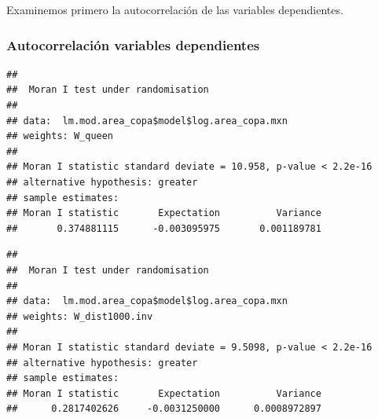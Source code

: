 \documentclass[12pt,]{book}
\newenvironment{Shaded}{\begin{snugshade}}{\end{snugshade}}
\newcommand{\KeywordTok}[1]{\textcolor[rgb]{0.13,0.29,0.53}{\textbf{#1}}}
\newcommand{\DataTypeTok}[1]{\textcolor[rgb]{0.13,0.29,0.53}{#1}}
\newcommand{\OtherTok}[1]{\textcolor[rgb]{0.56,0.35,0.01}{#1}}
\newcommand{\OperatorTok}[1]{\textcolor[rgb]{0.81,0.36,0.00}{\textbf{#1}}}
\newcommand{\NormalTok}[1]{#1}
\begin{document}
Examinemos primero la autocorrelación de las variables dependientes.

\subsubsection{Autocorrelación variables
dependientes}\label{autocorrelacion-variables-dependientes}

\begin{Shaded}
\end{Shaded}

\begin{verbatim}
## 
##  Moran I test under randomisation
## 
## data:  lm.mod.area_copa$model$log.area_copa.mxn  
## weights: W_queen  
## 
## Moran I statistic standard deviate = 10.958, p-value < 2.2e-16
## alternative hypothesis: greater
## sample estimates:
## Moran I statistic       Expectation          Variance 
##       0.374881115      -0.003095975       0.001189781
\end{verbatim}

\begin{Shaded}
\end{Shaded}

\begin{verbatim}
## 
##  Moran I test under randomisation
## 
## data:  lm.mod.area_copa$model$log.area_copa.mxn  
## weights: W_dist1000.inv  
## 
## Moran I statistic standard deviate = 9.5098, p-value < 2.2e-16
## alternative hypothesis: greater
## sample estimates:
## Moran I statistic       Expectation          Variance 
##      0.2817402626     -0.0031250000      0.0008972897
\end{verbatim}
\end{document}
